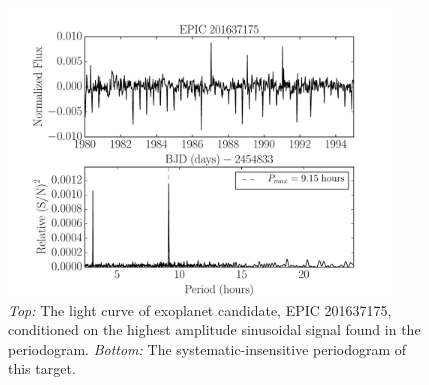 \documentclass[useAMS, usenatbib]{aastex}
\begin{document}
\begin{figure}
\begin{center}
\includegraphics[width=4in, clip=true]{planet_201637175.pdf}
\caption{{\it Top:} The light curve of exoplanet candidate, EPIC 201637175,
	conditioned on the highest amplitude sinusoidal signal found in the
	periodogram. {\it Bottom:} The systematic-insensitive periodogram of
	this target.}
\label{fig:planet}
\end{center}
\end{figure}



\end{document}
